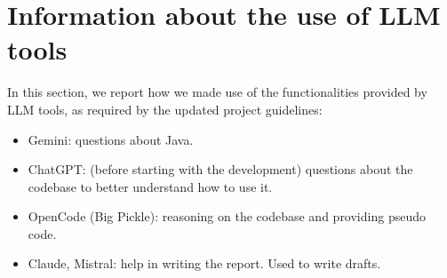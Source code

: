 \documentclass[a4paper]{article}
\begin{document}
    \section{Information about the use of LLM tools}
    In this section, we report how we made use of the functionalities provided by LLM tools, as required by the updated project guidelines:
        \begin{itemize}
            \item Gemini: questions about Java.
            \item ChatGPT: (before starting with the development) questions about the codebase to better understand how to use it.
            \item OpenCode (Big Pickle): reasoning on the codebase and providing pseudo code.
            \item Claude, Mistral: help in writing the report. Used to write drafts.
        \end{itemize}
\end{document}
